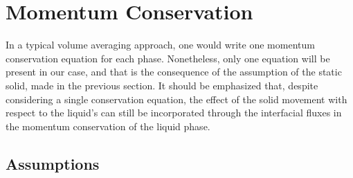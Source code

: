 \section{Momentum Conservation}
In a typical volume averaging approach, one would write one momentum conservation 
equation for each phase. Nonetheless, only one equation will be present in our case, 
and that is the consequence of the assumption of the static solid, made in the previous 
section. It should be emphasized that, despite considering a single conservation equation, 
the effect of the solid movement with respect to the liquid's can still be incorporated 
through the interfacial fluxes in the momentum conservation of the liquid phase. 
\subsection{Assumptions}
